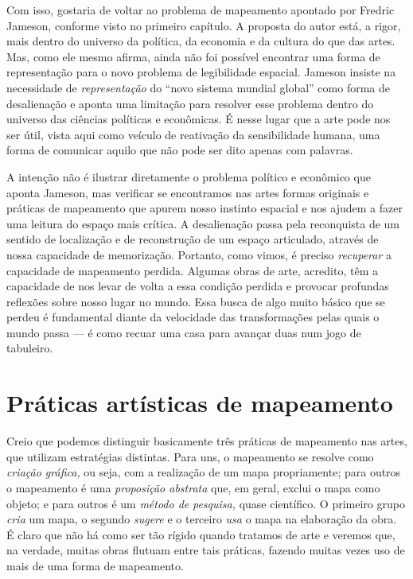 Com isso, gostaria de voltar ao problema de mapeamento apontado por
Fredric Jameson, conforme visto no primeiro capítulo. A proposta do
autor está, a rigor, mais dentro do universo da política, da economia e
da cultura do que das artes. Mas, como ele mesmo afirma, ainda não foi
possível encontrar uma forma de representação para o novo problema de
legibilidade espacial. Jameson insiste na necessidade de
\emph{representação} do ``novo sistema mundial global'' como forma de
desalienação e aponta uma limitação para resolver esse problema dentro
do universo das ciências políticas e econômicas. É nesse lugar que a arte pode nos ser útil, vista aqui como veículo de reativação da sensibilidade humana, uma forma de comunicar aquilo que não pode ser dito apenas com palavras.

A intenção não é ilustrar diretamente o problema político e econômico
que aponta Jameson, mas verificar se encontramos nas artes formas
originais e práticas de mapeamento que apurem nosso instinto espacial e
nos ajudem a fazer uma leitura do espaço mais crítica. A desalienação
passa pela reconquista de um sentido de localização e de reconstrução de
um espaço articulado, através de nossa capacidade de memorização.
Portanto, como vimos, é preciso \emph{recuperar} a capacidade de
mapeamento perdida. Algumas obras de arte, acredito, têm a capacidade de
nos levar de volta a essa condição perdida e provocar profundas
reflexões sobre nosso lugar no mundo. Essa busca de algo muito básico
que se perdeu é fundamental diante da velocidade das transformações
pelas quais o mundo passa --- é como recuar uma casa para avançar duas
num jogo de tabuleiro.

\chapter{Práticas artísticas de mapeamento}

Creio que podemos distinguir basicamente três práticas de mapeamento nas
artes, que utilizam estratégias distintas. Para uns, o mapeamento se
resolve como \emph{criação gráfica,} ou seja, com a realização de um
mapa propriamente; para outros o mapeamento é uma \emph{proposição
abstrata} que, em geral, exclui o mapa como objeto; e para outros é um
\emph{método de} \emph{pesquisa,} quase científico. O primeiro grupo
\emph{cria} um mapa, o segundo \emph{sugere} e o terceiro \emph{usa} o
mapa na elaboração da obra. É claro que não há como ser tão rígido
quando tratamos de arte e veremos que, na verdade, muitas obras flutuam
entre tais práticas, fazendo muitas vezes uso de mais de uma forma de
mapeamento.

